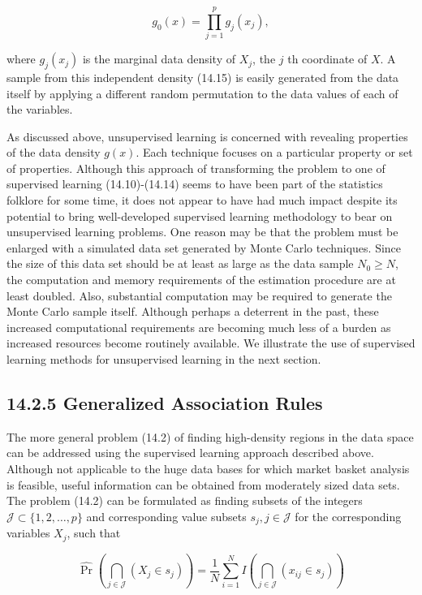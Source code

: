 \documentclass[10pt]{article}
\begin{document}
\begin{equation*}
g_{0}(x)=\prod_{j=1}^{p} g_{j}\left(x_{j}\right), \tag{14.15}
\end{equation*}


where $g_{j}\left(x_{j}\right)$ is the marginal data density of $X_{j}$, the $j$ th coordinate of $X$. A sample from this independent density (14.15) is easily generated from the data itself by applying a different random permutation to the data values of each of the variables.

As discussed above, unsupervised learning is concerned with revealing properties of the data density $g(x)$. Each technique focuses on a particular property or set of properties. Although this approach of transforming the problem to one of supervised learning (14.10)-(14.14) seems to have been part of the statistics folklore for some time, it does not appear to have had much impact despite its potential to bring well-developed supervised learning methodology to bear on unsupervised learning problems. One reason may be that the problem must be enlarged with a simulated data set generated by Monte Carlo techniques. Since the size of this data set should be at least as large as the data sample $N_{0} \geq N$, the computation and memory requirements of the estimation procedure are at least doubled. Also, substantial computation may be required to generate the Monte Carlo sample itself. Although perhaps a deterrent in the past, these increased computational requirements are becoming much less of a burden as increased resources become routinely available. We illustrate the use of supervised learning methods for unsupervised learning in the next section.

\subsection*{14.2.5 Generalized Association Rules}
The more general problem (14.2) of finding high-density regions in the data space can be addressed using the supervised learning approach described above. Although not applicable to the huge data bases for which market basket analysis is feasible, useful information can be obtained from moderately sized data sets. The problem (14.2) can be formulated as finding subsets of the integers $\mathcal{J} \subset\{1,2, \ldots, p\}$ and corresponding value subsets $s_{j}, j \in \mathcal{J}$ for the corresponding variables $X_{j}$, such that


\begin{equation*}
\widehat{\operatorname{Pr}}\left(\bigcap_{j \in \mathcal{J}}\left(X_{j} \in s_{j}\right)\right)=\frac{1}{N} \sum_{i=1}^{N} I\left(\bigcap_{j \in \mathcal{J}}\left(x_{i j} \in s_{j}\right)\right) \tag{14.16}
\end{equation*}
\end{document}
